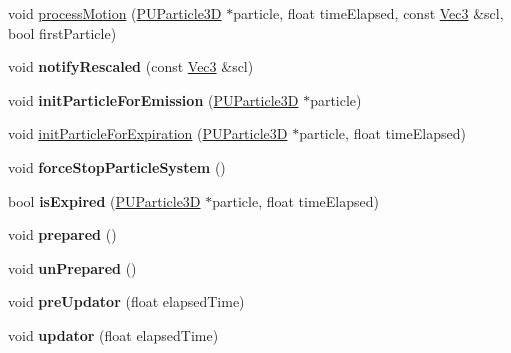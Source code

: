 \begin{DoxyCompactItemize}
\item 
void \hyperlink{classPUParticleSystem3D_aa1ce823834d5c5a76f98794b3f1f4bf1}{process\+Motion} (\hyperlink{structPUParticle3D}{P\+U\+Particle3D} $\ast$particle, float time\+Elapsed, const \hyperlink{classVec3}{Vec3} \&scl, bool first\+Particle)
\item 
\mbox{\label{classPUParticleSystem3D_a3ac2e314ae639c48f8f2337bab154f9b}} 
void {\bfseries notify\+Rescaled} (const \hyperlink{classVec3}{Vec3} \&scl)
\item 
\mbox{\label{classPUParticleSystem3D_a8ad9ce6e1e36f69948cbd73cfb0056b5}} 
void {\bfseries init\+Particle\+For\+Emission} (\hyperlink{structPUParticle3D}{P\+U\+Particle3D} $\ast$particle)
\item 
void \hyperlink{classPUParticleSystem3D_af3b1378bee6fa5d3eaa4bc449be8828f}{init\+Particle\+For\+Expiration} (\hyperlink{structPUParticle3D}{P\+U\+Particle3D} $\ast$particle, float time\+Elapsed)
\item 
\mbox{\label{classPUParticleSystem3D_a96545a2bd84998cd93728e8163d0c451}} 
void {\bfseries force\+Stop\+Particle\+System} ()
\item 
\mbox{\label{classPUParticleSystem3D_a7567220ce7b136db61d697fefe28ef0e}} 
bool {\bfseries is\+Expired} (\hyperlink{structPUParticle3D}{P\+U\+Particle3D} $\ast$particle, float time\+Elapsed)
\item 
\mbox{\label{classPUParticleSystem3D_a831cca267d8feefbbf6a1f2bb5148792}} 
void {\bfseries prepared} ()
\item 
\mbox{\label{classPUParticleSystem3D_a90fe96faae7966e36f39756bd4a0d262}} 
void {\bfseries un\+Prepared} ()
\item 
\mbox{\label{classPUParticleSystem3D_aae4c1d47b37f4f6207aa73274cc3acc0}} 
void {\bfseries pre\+Updator} (float elapsed\+Time)
\item 
\mbox{\label{classPUParticleSystem3D_a18cd8401c1fcdf4babeed555b2883d64}} 
void {\bfseries updator} (float elapsed\+Time)
\item 

\end{DoxyCompactItemize}

